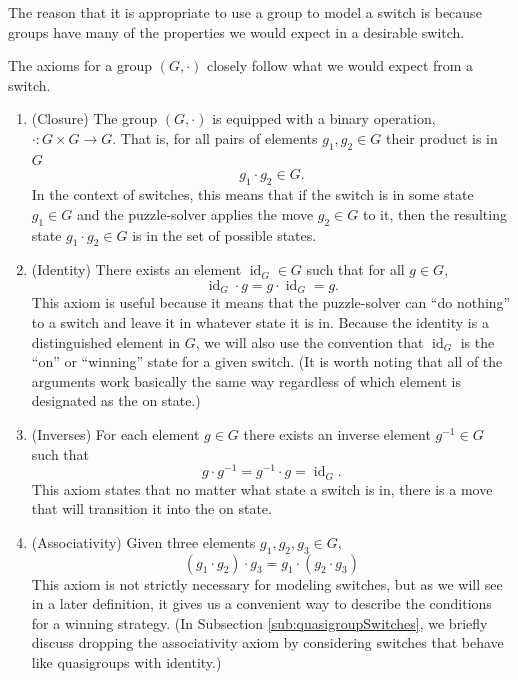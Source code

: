 The reason that it is appropriate to use a group to model a switch
is because groups have many of the properties we would expect in a desirable
switch.
\begin{note}
  The axioms for a group $(G, \cdot)$ closely follow what we would expect from
  a switch.
\end{note}
\begin{enumerate}
  \item (Closure) The group $(G, \cdot)$ is equipped with a binary operation,
  $\cdot \colon G \times G \rightarrow G$. That is, for all pairs of elements
   $g_1, g_2 \in G$ their product is in $G$ \begin{equation}
     g_1 \cdot g_2 \in G.
  \end{equation}
  In the context of switches, this
  means that if the switch is in some state $g_1 \in G$ and the puzzle-solver
  applies the move $g_2 \in G$ to it,
  then the resulting state $g_1 \cdot g_2 \in G$ is in the set of possible
  states.
  \item (Identity) There exists an element $\operatorname{id}_G \in G$ such that
  for all $g \in G$, \begin{equation}
    \operatorname{id}_G \cdot g = g \cdot \operatorname{id}_G = g.
  \end{equation}
  This axiom is useful because it means that the puzzle-solver can ``do nothing''
  to a switch and leave it in whatever state it is in.
  Because the identity is a distinguished element in $G$,
  we will also use the convention that
  $\operatorname{id}_G$ is the ``on'' or ``winning'' state for a given switch.
  (It is worth noting that all of the arguments work basically the same way
  regardless of which element is designated as the on state.)
  \item (Inverses) For each element $g \in G$ there exists an inverse element
  $g^{-1} \in G$ such that \begin{equation}
    g \cdot g^{-1} = g^{-1} \cdot g = \operatorname{id}_G.
  \end{equation}
  This axiom states that no matter what state a switch is in,
  there is a move that will transition it into the on state.
  \item (Associativity) Given three elements $g_1, g_2, g_3 \in G$,
  \begin{equation}
    (g_1 \cdot g_2) \cdot g_3 = g_1 \cdot (g_2 \cdot g_3)
  \end{equation}
  This axiom is not strictly necessary for modeling switches,
  but as we will see in a later definition, it gives us a convenient way to
  describe the conditions for a winning strategy.
  (In Subsection \ref{sub:quasigroupSwitches}, we briefly discuss dropping
  the associativity axiom by considering switches that behave like
  quasigroups with identity.)
\end{enumerate}


